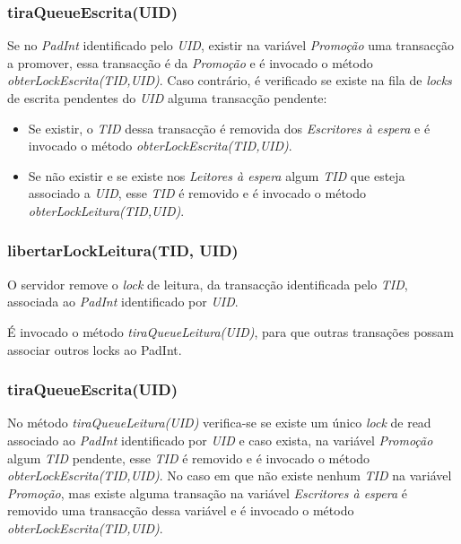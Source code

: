 \subsubsection{tiraQueueEscrita(UID)}

Se no \textit{PadInt} identificado pelo \textit{UID}, existir na variável \textit{Promoção} uma transacção a promover, essa transacção é da \textit{Promoção} e é invocado o método \textit{obterLockEscrita(TID,UID)}. Caso contrário, é verificado se existe na fila de \textit{locks} de escrita pendentes do \textit{UID} alguma transacção pendente:
\begin{itemize}
	\item Se existir, o \textit{TID} dessa transacção é removida dos \textit{Escritores à espera} e é invocado o método \textit{obterLockEscrita(TID,UID)}. 
	\item Se não existir e se existe nos \textit{Leitores à espera} algum \textit{TID}  que esteja associado a \textit{UID}, esse \textit{TID} é removido e é invocado o método \textit{obterLockLeitura(TID,UID)}.
\end{itemize}

\subsubsection{libertarLockLeitura(TID, UID)}

O servidor remove o \textit{lock} de leitura, da transacção identificada pelo \textit{TID}, associada ao \textit{PadInt} identificado por \textit{UID}.

É invocado o método \textit{tiraQueueLeitura(UID)}, para que outras transações possam associar outros locks ao PadInt.

\subsubsection{tiraQueueEscrita(UID)}

No método \textit{tiraQueueLeitura(UID)} verifica-se se existe um único \textit{lock} de read associado ao \textit{PadInt} identificado por \textit{UID} e caso exista, na variável \textit{Promoção} algum \textit{TID} pendente, esse \textit{TID} é removido e é invocado o método \textit{obterLockEscrita(TID,UID)}. No caso em que não existe nenhum \textit{TID} na variável \textit{Promoção}, mas existe alguma transação na variável \textit{Escritores à espera} é removido uma transacção dessa variável e é invocado o método \textit{obterLockEscrita(TID,UID)}.

